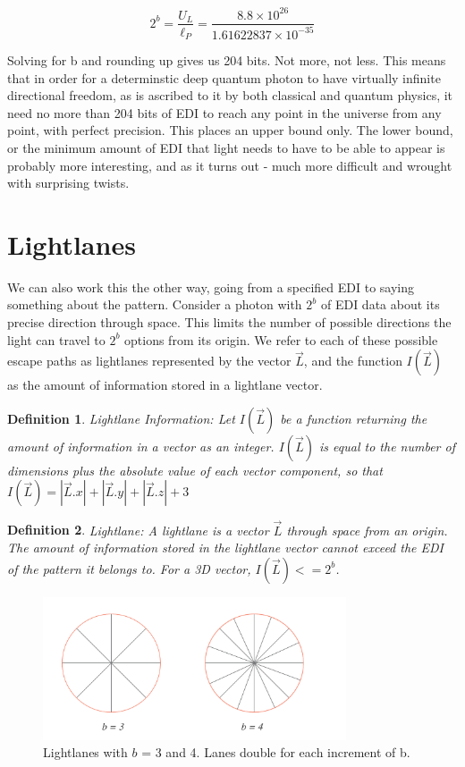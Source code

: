 \documentclass[notitlepage]{article}
\newtheorem{definition}{Definition}[section]
\begin{document}
\begin{equation}\label{eq:universesize}
2^b =  \frac{U_L}{\ell_P} = \frac{8.8\times10^{26} }{1.61622837 \times 10^{-35}} 
\end{equation}

Solving for b and rounding up gives us 204 bits. Not more, not less. This means that in order for a determinstic deep quantum photon to have virtually infinite directional freedom, as is ascribed to it by both  classical and quantum physics, it need no more than 204 bits of EDI to reach any point in the universe from any point, with perfect precision. This places an upper bound only. The lower bound, or the minimum amount of EDI that light needs to have to be able to appear is probably more interesting, and as it turns out - much more difficult and wrought with surprising twists.


\section{Lightlanes}
We can also work this the other way, going from a specified EDI to saying something about the pattern. Consider a photon with $2^b$ of EDI data about its precise direction through space. This limits the number of possible directions the light can travel to $2^b$ options from its origin. We refer to each of these possible escape paths as lightlanes represented by the vector $\vec{L}$, and the function $I(\vec{L})$ as the amount of information stored in a lightlane vector.

\begin{definition}{ Lightlane Information:}
Let $I(\vec{L})$ be a function returning the amount of information in a vector as an integer. $I(\vec{L})$ is equal to the number of dimensions plus the absolute value of each vector component, so that $I(\vec{L})  = |\vec{L}.x| +  |\vec{L}.y| + |\vec{L}.z| + 3$
\end{definition}
\begin{definition}{ Lightlane:}
A lightlane is a vector $\vec{L}$  through space from an origin. The amount of information stored in the lightlane vector cannot exceed the EDI of the pattern it belongs to. For a 3D vector,  $I (\vec{L}) <=  2^b$.
\end{definition}

\begin{figure}[!ht]
  \centering

 \includegraphics[width=0.8\textwidth, trim={0cm 0cm 0cm 0cm},clip]{Illustrations/lightlanes.pdf}
  \caption{Lightlanes with $b$ = 3 and 4. Lanes double for each increment of b. }
      \label{fig:1}
\end{figure}
\end{document}
